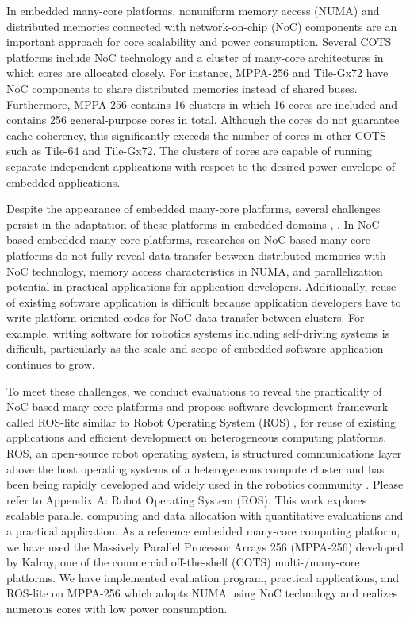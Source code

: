 In embedded many-core platforms, nonuniform memory access (NUMA) and distributed memories connected with network-on-chip (NoC) components are an important approach for core scalability and power consumption.
Several COTS platforms include NoC technology and a cluster of many-core architectures in which cores are  allocated closely.
For instance, MPPA-256 and Tile-Gx72 have NoC components to share distributed memories instead of shared buses.
Furthermore, MPPA-256 contains 16 clusters in which 16 cores are included and contains 256 general-purpose cores in total.
Although the cores do not guarantee cache coherency, this significantly exceeds the number of cores in other COTS such as Tile-64 and Tile-Gx72.
The clusters of cores are capable of running separate independent applications with respect to the desired power envelope of embedded applications.

Despite the appearance of embedded many-core platforms, several challenges persist in the adaptation of these platforms in embedded domains \cite{becker2016contention}, \cite{saidi2015shift}.
In NoC-based embedded many-core platforms, researches on NoC-based many-core platforms do not fully reveal data transfer between distributed memories with NoC technology, memory access characteristics in NUMA, and parallelization potential in practical applications for application developers.
Additionally, reuse of existing software application is difficult because application developers have to write platform oriented codes for NoC data transfer between clusters.
For example, writing software for robotics systems including self-driving systems is difficult, particularly as the scale and scope of embedded software application continues to grow.

To meet these challenges, we conduct evaluations to reveal the practicality of NoC-based many-core platforms and propose software development framework called ROS-lite similar to Robot Operating System (ROS) \cite{quigley2009ros}, \cite{rosorg} for reuse of existing applications and efficient development on heterogeneous computing platforms.
ROS, an open-source robot operating system, is structured communications layer above the host operating systems of a heterogeneous compute cluster and has been being rapidly developed and widely used in the robotics community \cite{cousins2011exponential}.
Please refer to Appendix A: Robot Operating System (ROS).
This work explores scalable parallel computing and data allocation with quantitative evaluations and a practical application.
As a reference embedded many-core computing platform, we have used the Massively Parallel Processor Arrays 256 (MPPA-256) developed by Kalray, one of the commercial off-the-shelf (COTS) multi-/many-core platforms.
We have implemented evaluation program, practical applications, and ROS-lite on MPPA-256 \cite{de2014time} which adopts NUMA using NoC technology and realizes numerous cores with low power consumption.

